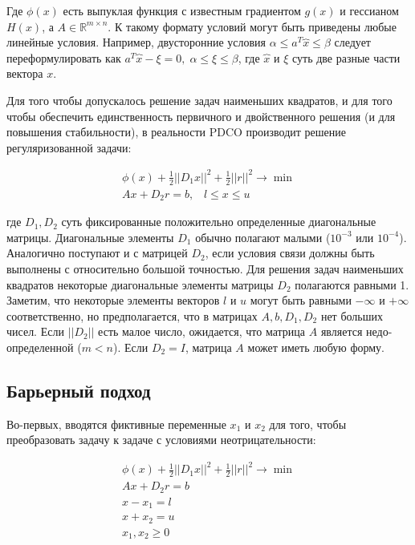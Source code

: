 \documentclass[a4paper, 12pt, titlepage]{article}
\theoremstyle{definition}
\theoremstyle{plain}
\theoremstyle{plain}
\begin{document}
Где $\phi(x)$ есть выпуклая функция с известным градиентом $g(x)$ и гессианом
$H(x)$, а $A \in \mathbb{R}^{m \times n}$. К такому формату условий могут быть 
приведены любые линейные условия. Например, двусторонние условия
$\alpha \leq a^{T} \overbrace{x} \leq \beta$ следует переформулировать как
$a^{T} \overbrace{x} - \xi = 0, \; \alpha \leq \xi \leq \beta$, где 
$\overbrace{x}$ и $\xi$ суть две разные части вектора $x$.

Для того чтобы допускалось решение задач наименьших квадратов, и для того чтобы
обеспечить единственность первичного и двойственного решения (и для повышения
стабильности), в реальности PDCO производит решение регуляризованной задачи:

\begin{equation}
 \begin{aligned}
  \phi(x) + \frac{1}{2}||D_{1} x||^{2} + \frac{1}{2}||r||^{2} \to \min \\
  A x + D_{2} r = b, \;\;\; l \leq x \leq u
 \end{aligned}
\end{equation}

где $D_{1}, D_{2}$ суть фиксированные положительно определенные диагональные
матрицы. Диагональные элементы $D_{1}$ обычно полагают малыми ($10^{-3}$ или
$10^{-4}$). Аналогично поступают и с матрицей $D_{2}$, если условия связи
должны быть выполнены с относительно большой точностью. Для решения задач
наименьших квадратов некоторые диагональные элементы матрицы $D_{2}$ полагаются
равными 1. Заметим, что некоторые элементы векторов $l$ и $u$ могут быть 
равными $-\infty$ и $+\infty$ соответственно, но предполагается, что в матрицах
$A, b, D_{1}, D_{2}$ нет больших чисел. Если $||D_{2}||$ есть малое число,
ожидается, что матрица $A$ является недо-определенной ($m < n$). Если
$D_{2} = I$, матрица $A$ может иметь любую форму.

\subsection{Барьерный подход}
Во-первых, вводятся фиктивные переменные $x_{1}$ и $x_{2}$ для того, чтобы
преобразовать задачу к задаче с условиями неотрицательности:

\begin{equation}
 \label{eq:co}
 \begin{aligned}
  \phi(x) + \frac{1}{2}||D_{1} x||^{2} + \frac{1}{2}||r||^{2} \to \min \\
  A x + D_{2} r = b \\
  x - x_{1} = l \\
  x + x_{2} = u \\
  x_{1}, x_{2} \geq 0 \\
 \end{aligned}
\end{equation}
\end{document}
